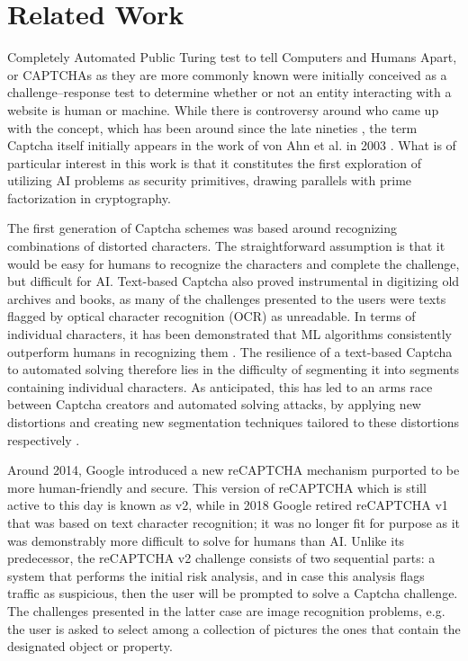 \section{Related Work}
\label{sec:related}

Completely Automated Public Turing test to tell Computers and Humans Apart, or CAPTCHAs as they are more commonly known were initially conceived as a challenge–response test to determine whether or not an entity interacting with a website is human or machine.
While there is controversy around who came up with the concept, which has been around since the late nineties \cite{naor1996verification}, the term Captcha itself initially appears in the work of von Ahn et al. in 2003 \cite{von2003captcha}.
What is of particular interest in this work is that it constitutes the first exploration of utilizing AI problems as security primitives, drawing parallels with prime factorization in cryptography.

The first generation of Captcha schemes was based around recognizing combinations of distorted characters.
The straightforward assumption is that it would be easy for humans to recognize the characters and complete the challenge, but difficult for AI.
Text-based Captcha also proved instrumental in digitizing old archives and books, as many of the challenges presented to the users were texts flagged by optical character recognition (OCR) as unreadable.
In terms of individual characters, it has been demonstrated that \gls{ML} algorithms consistently outperform humans in recognizing them \cite{chellapilla2005computers}.
The resilience of a text-based Captcha to automated solving therefore lies in the difficulty of segmenting it into segments containing individual characters\cite{bursztein2014end}.
As anticipated, this has led to an arms race between Captcha creators and automated solving attacks, by applying new distortions and creating new segmentation techniques tailored to these distortions respectively \cite{cruz2012breaking}.

Around 2014, Google introduced a new reCAPTCHA mechanism purported to be more human-friendly and secure.
This version of reCAPTCHA which is still active to this day is known as v2, while in 2018 Google retired reCAPTCHA v1 that was based on text character recognition; it was no longer fit for purpose as it was demonstrably more difficult to solve for humans than AI.
Unlike its predecessor, the reCAPTCHA v2 challenge consists of two sequential parts: a system that performs the initial risk analysis, and in case this analysis flags traffic as suspicious, then the user will be prompted to solve a Captcha challenge.
The challenges presented in the latter case are image recognition problems, e.g. the user is asked to select among a collection of pictures the ones that contain the designated object or property.

